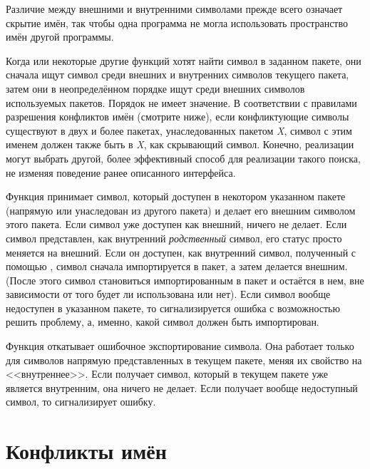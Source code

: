 Различие между внешними и внутренними символами прежде всего означает скрытие
имён, так чтобы одна программа не могла использовать пространство имён другой
программы.

Когда  или некоторые другие функций хотят найти символ в заданном
пакете, они сначала ищут символ среди внешних и внутренних символов текущего
пакета, затем они в неопределённом порядке ищут среди внешних символов
используемых пакетов. Порядок не имеет значение. В соответствии с правилами
разрешения конфликтов имён (смотрите ниже), если конфликтующие символы существуют
в двух и более пакетах, унаследованных пакетом \emph{X}, символ с этим именем
должен также быть в \emph{X}, как скрывающий символ. Конечно, реализации могут
выбрать другой, более эффективный способ для реализации такого поиска, не
изменяя поведение ранее описанного интерфейса.

Функция  принимает символ, который доступен в некотором указанном
пакете (напрямую или унаследован из другого пакета) и делает его внешним символом
этого пакета. Если символ уже доступен как внешний,  ничего не
делает. Если символ представлен, как внутренний \emph{родственный} символ, его
статус просто меняется на внешний. Если он доступен, как внутренний символ,
полученный с помощью , символ сначала импортируется в пакет, а
затем делается внешним. (После этого символ становиться импортированным в пакет
и остаётся в нем, вне зависимости от того будет ли использована
 или нет). Если символ вообще недоступен в указанном пакете,
то сигнализируется ошибка с возможностью решить проблему, а, именно, какой
символ должен быть импортирован.

Функция  откатывает ошибочное экспортирование
символа. Она работает только для символов напрямую представленных в
текущем пакете, меняя их свойство на <<внутреннее>>.  Если
 получает символ, который в текущем пакете уже является
внутренним, она ничего не делает. Если получает вообще недоступный
символ, то сигнализирует ошибку.

\section{Конфликты имён}
\label{NAME-CONFLICTS-SECTION}

